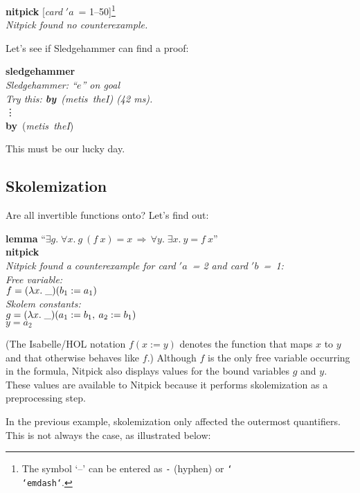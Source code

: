 \documentclass[a4paper,12pt]{article}
\def\undef{(\lambda x.\; \_)}
\renewcommand\_{\hbox{\textunderscore\kern-.05ex}}
\begin{document}
\prew
\textbf{nitpick} [\textit{card} $'a$~= 1--50]\footnote{The symbol `--'
can be entered as \texttt{-} (hyphen) or
\texttt{\char`\\\char`\<emdash\char`\>}.} \\[2\smallskipamount]
\slshape Nitpick found no counterexample.
\postw

Let's see if Sledgehammer can find a proof:

\prew
\textbf{sledgehammer} \\[2\smallskipamount]
{\slshape Sledgehammer: ``$e$'' on goal \\
Try this: \textbf{by}~(\textit{metis~theI}) (42 ms).} \\
\hbox{}\qquad\vdots \\[2\smallskipamount]
\textbf{by}~(\textit{metis~theI\/})
\postw

This must be our lucky day.

\subsection{Skolemization}
\label{skolemization}

Are all invertible functions onto? Let's find out:

\prew
\textbf{lemma} ``$\exists g.\; \forall x.~g~(f~x) = x
 \,\Longrightarrow\, \forall y.\; \exists x.~y = f~x$'' \\
\textbf{nitpick} \\[2\smallskipamount]
\slshape
Nitpick found a counterexample for \textit{card} $'a$~= 2 and \textit{card} $'b$~=~1: \\[2\smallskipamount]
\hbox{}\qquad Free variable: \nopagebreak \\
\hbox{}\qquad\qquad $f = \undef{}(b_1 := a_1)$ \\
\hbox{}\qquad Skolem constants: \nopagebreak \\
\hbox{}\qquad\qquad $g = \undef{}(a_1 := b_1,\> a_2 := b_1)$ \\
\hbox{}\qquad\qquad $y = a_2$
\postw

(The Isabelle/HOL notation $f(x := y)$ denotes the function that maps $x$ to $y$
and that otherwise behaves like $f$.)
Although $f$ is the only free variable occurring in the formula, Nitpick also
displays values for the bound variables $g$ and $y$. These values are available
to Nitpick because it performs skolemization as a preprocessing step.

In the previous example, skolemization only affected the outermost quantifiers.
This is not always the case, as illustrated below:
\end{document}

